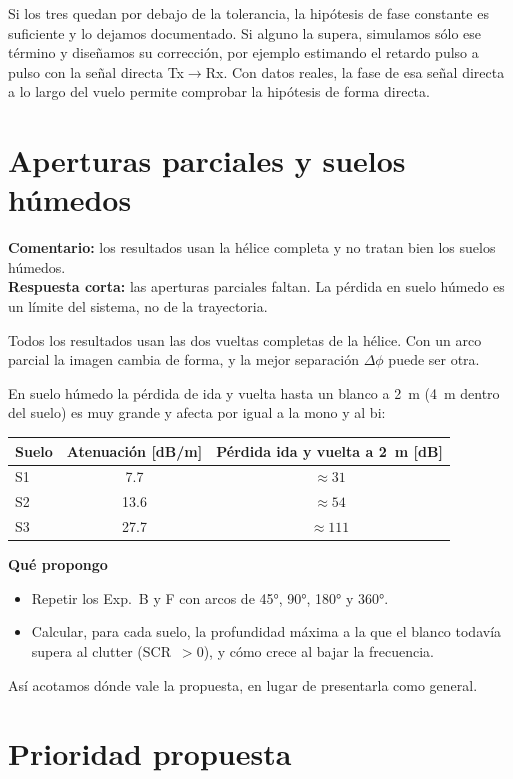 \documentclass[11pt,a4paper]{article}
\newcommand{\encorto}[2]{\par\noindent\colorbox{acento!7}{\parbox{\dimexpr\linewidth-2\fboxsep}{%
\small\textbf{Comentario:} #1\\[1pt]\textbf{Respuesta corta:} #2}}\par\smallskip}
\newcommand{\paso}[1]{\par\smallskip\needspace{5\baselineskip}\noindent\textbf{\color{acento}#1}\par}
\begin{document}
Si los tres quedan por debajo de la tolerancia, la hipótesis de fase constante es
suficiente y lo dejamos documentado. Si alguno la supera, simulamos sólo ese término y
diseñamos su corrección, por ejemplo estimando el retardo pulso a pulso con la señal
directa Tx$\to$Rx. Con datos reales, la fase de esa señal directa a lo largo del vuelo
permite comprobar la hipótesis de forma directa.

\section{Aperturas parciales y suelos húmedos}

\encorto{los resultados usan la hélice completa y no tratan bien los suelos húmedos.}
{las aperturas parciales faltan. La pérdida en suelo húmedo es un límite del sistema, no
de la trayectoria.}

Todos los resultados usan las dos vueltas completas de la hélice. Con un arco parcial la
imagen cambia de forma, y la mejor separación $\Delta\phi$ puede ser otra.

En suelo húmedo la pérdida de ida y vuelta hasta un blanco a 2~m (4~m dentro del suelo) es
muy grande y afecta por igual a la mono y al bi:

\begin{center}
\begin{tabular}{@{}lcc@{}}
\toprule
Suelo & Atenuación [dB/m] & Pérdida ida y vuelta a 2~m [dB] \\
\midrule
S1 & 7.7 & $\approx31$ \\
S2 & 13.6 & $\approx54$ \\
S3 & 27.7 & $\approx111$ \\
\bottomrule
\end{tabular}
\end{center}

\paso{Qué propongo}
\begin{itemize}
  \item Repetir los Exp.~B y F con arcos de 45°, 90°, 180° y 360°.
  \item Calcular, para cada suelo, la profundidad máxima a la que el blanco todavía
  supera al clutter (SCR~$>0$), y cómo crece al bajar la frecuencia.
\end{itemize}
Así acotamos dónde vale la propuesta, en lugar de presentarla como general.

\section{Prioridad propuesta}
\end{document}
